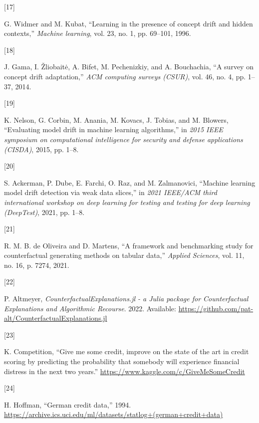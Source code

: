 \documentclass[
  conference]{IEEEtran}
\newlength{\cslhangindent}
\newlength{\csllabelwidth}
\newlength{\cslentryspacingunit} %
\newenvironment{CSLReferences}[2] %
 {%
  \setlength{\parindent}{0pt}
  \ifodd #1
  \let\oldpar\par
  \def\par{\hangindent=\cslhangindent\oldpar}
  \fi
  \setlength{\parskip}{#2\cslentryspacingunit}
 }%
 {}
\newcommand{\CSLLeftMargin}[1]{\parbox[t]{\csllabelwidth}{#1}}
\newcommand{\CSLRightInline}[1]{\parbox[t]{\linewidth - \csllabelwidth}{#1}\break}
\begin{document}
\begin{CSLReferences}{0}{0}
\leavevmode{}%
\CSLLeftMargin{{[}17{]} }%
\CSLRightInline{G. Widmer and M. Kubat, {``Learning in the presence of
concept drift and hidden contexts,''} \emph{Machine learning}, vol. 23,
no. 1, pp. 69--101, 1996.}

\leavevmode{}%
\CSLLeftMargin{{[}18{]} }%
\CSLRightInline{J. Gama, I. Žliobaitė, A. Bifet, M. Pechenizkiy, and A.
Bouchachia, {``A survey on concept drift adaptation,''} \emph{ACM
computing surveys (CSUR)}, vol. 46, no. 4, pp. 1--37, 2014.}

\leavevmode{}%
\CSLLeftMargin{{[}19{]} }%
\CSLRightInline{K. Nelson, G. Corbin, M. Anania, M. Kovacs, J. Tobias,
and M. Blowers, {``Evaluating model drift in machine learning
algorithms,''} in \emph{2015 IEEE symposium on computational
intelligence for security and defense applications (CISDA)}, 2015, pp.
1--8.}

\leavevmode{}%
\CSLLeftMargin{{[}20{]} }%
\CSLRightInline{S. Ackerman, P. Dube, E. Farchi, O. Raz, and M.
Zalmanovici, {``Machine learning model drift detection via weak data
slices,''} in \emph{2021 IEEE/ACM third international workshop on deep
learning for testing and testing for deep learning (DeepTest)}, 2021,
pp. 1--8.}

\leavevmode{}%
\CSLLeftMargin{{[}21{]} }%
\CSLRightInline{R. M. B. de Oliveira and D. Martens, {``A framework and
benchmarking study for counterfactual generating methods on tabular
data,''} \emph{Applied Sciences}, vol. 11, no. 16, p. 7274, 2021.}

\leavevmode{}%
\CSLLeftMargin{{[}22{]} }%
\CSLRightInline{P. Altmeyer, \emph{{CounterfactualExplanations.jl - a
Julia package for Counterfactual Explanations and Algorithmic
Recourse}}. 2022. Available:
\url{https://github.com/pat-alt/CounterfactualExplanations.jl}}

\leavevmode{}%
\CSLLeftMargin{{[}23{]} }%
\CSLRightInline{K. Competition, {``Give me some credit, improve on the
state of the art in credit scoring by predicting the probability that
somebody will experience financial distress in the next two years.''}
\url{https://www.kaggle.com/c/GiveMeSomeCredit}}

\leavevmode{}%
\CSLLeftMargin{{[}24{]} }%
\CSLRightInline{H. Hoffman, {``German credit data,''} 1994.
\url{https://archive.ics.uci.edu/ml/datasets/statlog+(german+credit+data)}}


\end{CSLReferences}
\end{document}
